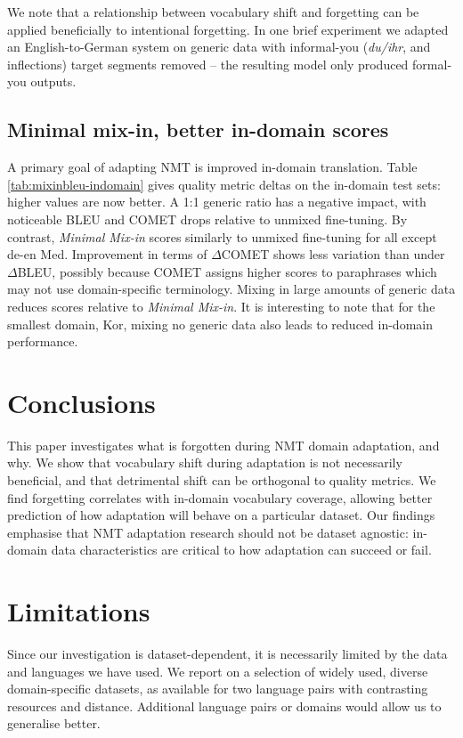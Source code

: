 \documentclass[11pt]{article}
\begin{document}
We note that a relationship between vocabulary shift and forgetting can be applied beneficially to intentional forgetting. In one brief experiment we adapted an English-to-German system on generic data with informal-you (\emph{du/ihr}, and inflections) target segments removed -- the resulting model only produced formal-you outputs.



\subsection{Minimal mix-in, better in-domain scores}


A primary goal of adapting NMT is improved in-domain translation.  Table \ref{tab:mixinbleu-indomain} gives quality metric deltas on the in-domain test sets: higher values are now better. A 1:1 generic  ratio has a negative impact, with noticeable BLEU and COMET drops relative to unmixed fine-tuning. By contrast,  \emph{Minimal Mix-in} scores similarly to unmixed fine-tuning for all except de-en Med. Improvement in terms of $\Delta$COMET shows less variation than under $\Delta$BLEU, possibly because COMET assigns higher scores to paraphrases which may not use domain-specific terminology.  Mixing in large amounts of generic data  reduces scores relative to \emph{Minimal Mix-in}. It is interesting to note that for the smallest domain, Kor, mixing no generic data also leads to reduced in-domain performance.


\section{Conclusions}
This paper investigates what is forgotten during NMT domain adaptation, and why. We show that vocabulary shift during adaptation is not necessarily beneficial, and that detrimental shift can be orthogonal to quality metrics. We find  forgetting correlates with in-domain vocabulary coverage, allowing better prediction of how adaptation will behave on a particular dataset. Our findings emphasise that NMT adaptation research should not be dataset agnostic: in-domain data characteristics are critical to how  adaptation can succeed or fail. 

\section*{Limitations}
Since our investigation is dataset-dependent, it is necessarily limited by the data and languages we have used. We report on a selection of widely used, diverse domain-specific datasets, as available for two language pairs with contrasting resources and distance. Additional language pairs or domains would allow us to generalise better.
\end{document}
